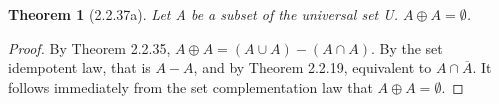 \documentclass[a4paper, 12pt]{article}
\theoremstyle{plain}
\newtheorem*{theorem*}{Theorem}
\begin{document}
	
	\begin{theorem*}[2.2.37a]
		Let A be a subset of the universal set U. $A \oplus A = \emptyset$.
	\end{theorem*}
	
	\begin{proof}
		By Theorem 2.2.35, $A \oplus A = (A \cup A) - (A \cap A)$. By the set idempotent law, that is $A - A$, and by Theorem 2.2.19, equivalent to $A \cap \overline{A}$. It follows immediately from the set complementation law that $A \oplus A = \emptyset$.
	\end{proof}
\end{document}
